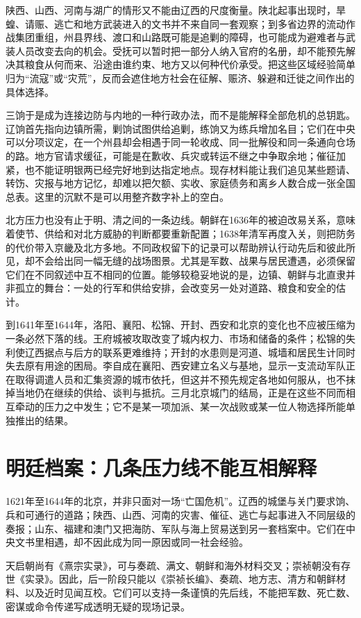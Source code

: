 陕西、山西、河南与湖广的情形又不能由辽西的尺度衡量。陕北起事出现时，旱蝗、请赈、逃亡和地方武装进入的文书并不来自同一套观察；到多省边界的流动作战集团重组，州县界线、渡口和山路既可能是追剿的障碍，也可能成为避难者与武装人员改变去向的机会。受抚可以暂时把一部分人纳入官府的名册，却不能预先解决其粮食从何而来、沿途由谁约束、地方又以何种代价承受。把这些区域经验简单归为“流寇”或“灾荒”，反而会遮住地方社会在征解、赈济、躲避和迁徙之间作出的具体选择。

三饷于是成为连接边防与内地的一种行政办法，而不是能解释全部危机的总钥匙。辽饷首先指向边镇所需，剿饷试图供给追剿，练饷又为练兵增加名目；它们在中央可以分项议定，在一个州县却会相遇于同一轮收成、同一批解役和同一条通向仓场的路。地方官请求缓征，可能是在歉收、兵灾或转运不继之中争取余地；催征加紧，也不能证明银两已经完好地到达指定地点。现存材料能让我们追见某些题请、转饬、灾报与地方记忆，却难以把欠额、实收、家庭债务和离乡人数合成一张全国总表。这里的沉默不是可以用整齐数字补上的空白。

北方压力也没有止于明、清之间的一条边线。朝鲜在1636年的被迫改易关系，意味着使节、供给和对北方威胁的判断都要重新配置；1638年清军再度入关，则把防务的代价带入京畿及北方多地。不同政权留下的记录可以帮助辨认行动先后和彼此所见，却不会给出同一幅无缝的战场图景。尤其是军数、战果与居民遭遇，必须保留它们在不同叙述中互不相同的位置。能够较稳妥地说的是，边镇、朝鲜与北直隶并非孤立的舞台：一处的行军和供给安排，会改变另一处对道路、粮食和安全的估计。

到1641年至1644年，洛阳、襄阳、松锦、开封、西安和北京的变化也不应被压缩为一条必然下落的线。王府城被攻取改变了城内权力、市场和储备的条件；松锦的失利使辽西据点与后方的联系更难维持；开封的水患则是河道、城墙和居民生计同时失去原有用途的困局。李自成在襄阳、西安建立名义与基地，显示一支流动军队正在取得调遣人员和汇集资源的城市依托，但这并不预先规定各地如何服从，也不抹掉当地仍在继续的供给、谈判与抵抗。三月北京城门的结局，正是在这些不同而相互牵动的压力之中发生；它不是某一项加派、某一次战败或某一位人物选择所能单独推出的结果。

\section{明廷档案：几条压力线不能互相解释}

1621年至1644年的北京，并非只面对一场“亡国危机”。辽西的城堡与关门要求饷、兵和可通行的道路；陕西、山西、河南的灾害、催征、逃亡与起事进入不同层级的奏报；山东、福建和澳门又把海防、军队与海上贸易送到另一套档案中。它们在中央文书里相遇，却不因此成为同一原因或同一社会经验。

天启朝尚有《熹宗实录》，可与奏疏、满文、朝鲜和海外材料交叉；崇祯朝没有存世《实录》。因此，后一阶段只能以《崇祯长编》、奏疏、地方志、清方和朝鲜材料、以及近时见闻互校。它们可以支持一条谨慎的先后线，不能把军数、死亡数、密谋或命令传递写成透明无疑的现场记录。

